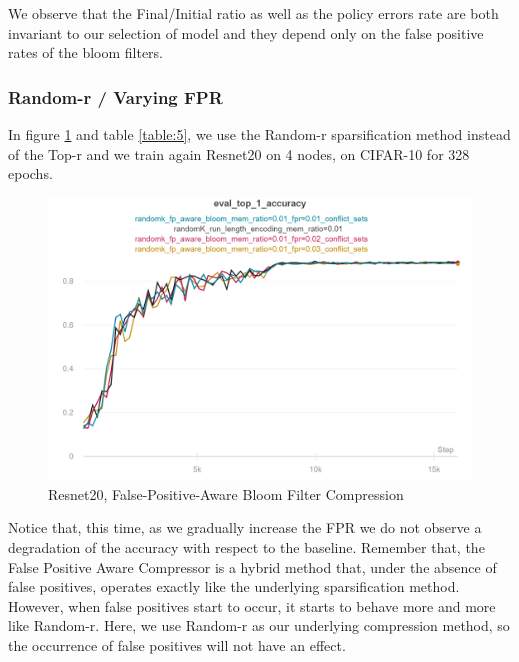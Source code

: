     We observe that the Final/Initial ratio as well as the policy errors rate are both invariant to our selection of model and they depend only on the false positive rates of the bloom filters.


    \newpage
    \subsubsection{Random-r / Varying FPR}


    In figure \ref{randomk-bloom} and table \ref{table:5}, we use the Random-r sparsification method instead of the Top-r and we train again Resnet20 on 4 nodes, on CIFAR-10 for 328 epochs.

    \begin{figure}[h]
    \centering
    \includegraphics[width=1\textwidth]{thesis/figures/randomk-bloom.png}
    \caption{Resnet20, False-Positive-Aware Bloom Filter Compression}
    \label{randomk-bloom}
    \end{figure}
    
    \vspace{1cm}

    Notice that, this time, as we gradually increase the FPR we do not observe a degradation of the accuracy with respect to the baseline.
    Remember that, the False Positive Aware Compressor is a hybrid method that, under the absence of false positives, operates exactly like the underlying sparsification method. 
    However, when false positives start to occur, it starts to behave more and more like Random-r.
    Here, we use Random-r as our underlying compression method, so the occurrence of false positives will not have an effect.
    
